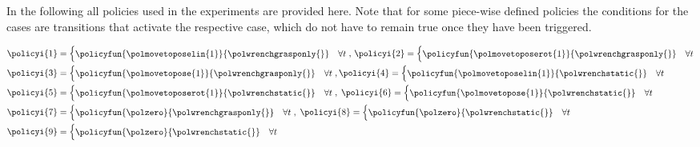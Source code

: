 In the following all policies used in the experiments are provided here.
Note that for some piece-wise defined policies the conditions for the cases are transitions that activate the respective case, which do not have to remain true once they have been triggered.

\begin{align*}
&\policyi{1}=\begin{cases}
\policyfun{\polmovetoposelin{1}}{\polwrenchgrasponly{}} & \forall t
\end{cases},\,
\policyi{2}=\begin{cases}
\policyfun{\polmovetoposerot{1}}{\polwrenchgrasponly{}} & \forall t
\end{cases}\\
&\policyi{3}=\begin{cases}
\policyfun{\polmovetopose{1}}{\polwrenchgrasponly{}} & \forall t
\end{cases},\policyi{4}=\begin{cases}
\policyfun{\polmovetoposelin{1}}{\polwrenchstatic{}} & \forall t
\end{cases}\\
&\policyi{5}=\begin{cases}
\policyfun{\polmovetoposerot{1}}{\polwrenchstatic{}} & \forall t
\end{cases},\;
\policyi{6}=\begin{cases}
\policyfun{\polmovetopose{1}}{\polwrenchstatic{}} & \forall t
\end{cases}\\
&\policyi{7}=\begin{cases}
\policyfun{\polzero}{\polwrenchgrasponly{}} & \forall t
\end{cases},\;
\policyi{8}=\begin{cases}
\policyfun{\polzero}{\polwrenchstatic{}} & \forall t
\end{cases}\\
&\policyi{9}=\begin{cases}
\policyfun{\polzero}{\polwrenchstatic{}} & \forall t
\end{cases}
\end{align*}

